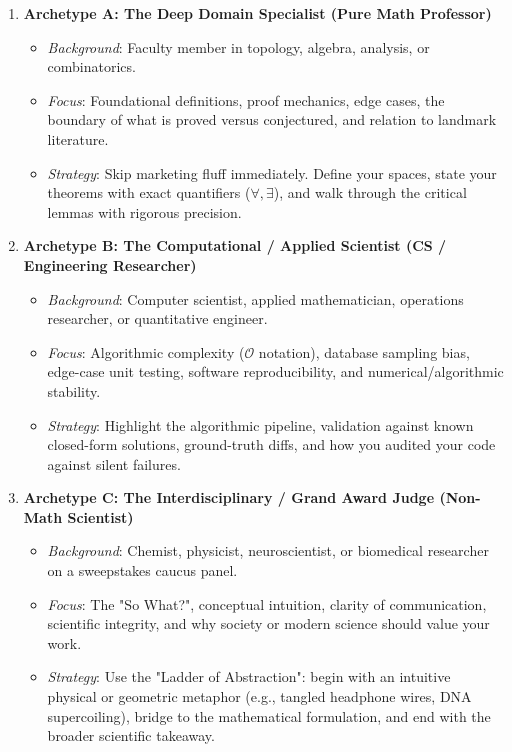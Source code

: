 \documentclass[11pt,letterpaper]{article}
\begin{document}
\begin{enumerate}[leftmargin=*]
    \item \textbf{Archetype A: The Deep Domain Specialist (Pure Math Professor)}
    \begin{itemize}
        \item \textit{Background}: Faculty member in topology, algebra, analysis, or combinatorics.
        \item \textit{Focus}: Foundational definitions, proof mechanics, edge cases, the boundary of what is proved versus conjectured, and relation to landmark literature.
        \item \textit{Strategy}: Skip marketing fluff immediately. Define your spaces, state your theorems with exact quantifiers ($\forall, \exists$), and walk through the critical lemmas with rigorous precision.
    \end{itemize}

    \item \textbf{Archetype B: The Computational / Applied Scientist (CS / Engineering Researcher)}
    \begin{itemize}
        \item \textit{Background}: Computer scientist, applied mathematician, operations researcher, or quantitative engineer.
        \item \textit{Focus}: Algorithmic complexity ($\mathcal{O}$ notation), database sampling bias, edge-case unit testing, software reproducibility, and numerical/algorithmic stability.
        \item \textit{Strategy}: Highlight the algorithmic pipeline, validation against known closed-form solutions, ground-truth diffs, and how you audited your code against silent failures.
    \end{itemize}

    \item \textbf{Archetype C: The Interdisciplinary / Grand Award Judge (Non-Math Scientist)}
    \begin{itemize}
        \item \textit{Background}: Chemist, physicist, neuroscientist, or biomedical researcher on a sweepstakes caucus panel.
        \item \textit{Focus}: The "So What?", conceptual intuition, clarity of communication, scientific integrity, and why society or modern science should value your work.
        \item \textit{Strategy}: Use the "Ladder of Abstraction": begin with an intuitive physical or geometric metaphor (e.g., tangled headphone wires, DNA supercoiling), bridge to the mathematical formulation, and end with the broader scientific takeaway.
    \end{itemize}
\end{enumerate}
\end{document}
